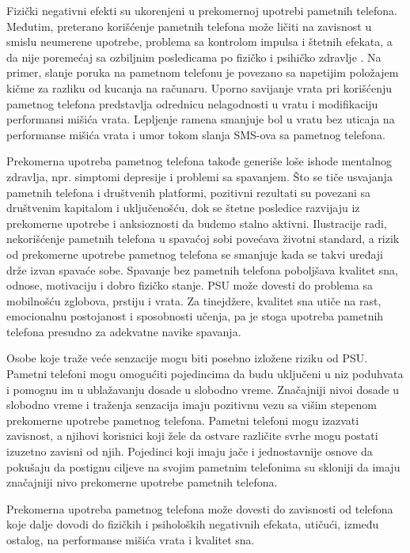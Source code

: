 \documentclass[a4paper]{article}
\begin{document}
Fizički negativni efekti su ukorenjeni u prekomernoj upotrebi
pametnih telefona\cite{consume}. Međutim, preterano korišćenje pametnih telefona
može ličiti na zavisnost u smislu neumerene upotrebe,
problema sa kontrolom impulsa i štetnih efekata,
a da nije poremećaj sa ozbiljnim posledicama po fizičko
i psihičko zdravlje \cite{addiction}. Na primer, slanje poruka na
pametnom telefonu je povezano sa napetijim
položajem kičme za razliku od kucanja na računaru.
Uporno savijanje vrata pri korišćenju pametnog telefona predstavlja odrednicu
nelagodnosti u vratu i modifikaciju performansi mišića vrata.
Lepljenje ramena smanjuje bol u vratu bez uticaja na performanse
mišića vrata i umor tokom slanja SMS-ova sa pametnog telefona\cite{addiction}.


Prekomerna upotreba pametnog telefona takođe generiše loše ishode mentalnog
zdravlja, npr. simptomi depresije i problemi sa spavanjem.
Što se tiče usvajanja pametnih telefona i društvenih platformi,
pozitivni rezultati su povezani sa društvenim kapitalom i uključenošću\cite{consume},
dok se štetne posledice razvijaju iz prekomerne upotrebe 
i anksioznosti da budemo stalno aktivni.
Ilustracije radi, nekorišćenje pametnih telefona u spavaćoj sobi
povećava životni standard, a rizik od prekomerne upotrebe pametnog
telefona se smanjuje kada se takvi uređaji drže izvan spavaće sobe.
Spavanje bez pametnih telefona poboljšava kvalitet sna, odnose, motivaciju
i dobro fizičko stanje.
PSU može dovesti do problema sa mobilnošću zglobova, prstiju i vrata.
Za tinejdžere, kvalitet sna utiče na rast,
emocionalnu postojanost i sposobnosti učenja, pa je stoga upotreba
pametnih telefona presudno za adekvatne navike spavanja\cite{consume}.


Osobe koje traže veće senzacije mogu biti posebno izložene riziku od PSU.
Pametni telefoni mogu omogućiti pojedincima da budu uključeni u niz poduhvata
i pomognu im u ublažavanju dosade u slobodno vreme.
Značajniji nivoi dosade u slobodno vreme i traženja senzacija\cite{ethics}
imaju pozitivnu vezu sa višim stepenom prekomerne upotrebe pametnog telefona.
Pametni telefoni mogu izazvati zavisnost,
a njihovi korisnici koji žele da ostvare različite svrhe mogu postati
izuzetno zavisni od njih.
Pojedinci koji imaju jače i jednostavnije osnove da pokušaju da postignu ciljeve
na svojim pametnim telefonima su skloniji da imaju značajniji
nivo prekomerne upotrebe pametnih telefona\cite{factors}.


Prekomerna upotreba pametnog telefona može dovesti do zavisnosti
od telefona koje dalje dovodi do fizičkih i psiholoških
negativnih efekata, utičući, između ostalog, na performanse mišića vrata
i kvalitet sna.
\end{document}
